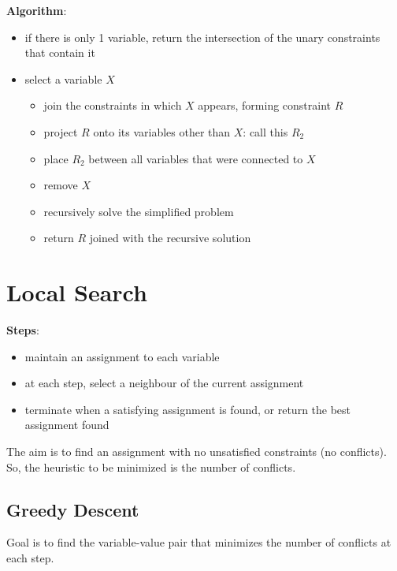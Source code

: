 \documentclass[11pt]{article}
\begin{document}
\textbf{Algorithm}:
\begin{itemize}
\item if there is only 1 variable, return the intersection of the unary constraints that contain it
\item select a variable \(X\)
\begin{itemize}
\item join the constraints in which \(X\) appears, forming constraint \(R\)
\item project \(R\) onto its variables other than \(X\): call this \(R_{2}\)
\item place \(R_{2}\) between all variables that were connected to \(X\)
\item remove \(X\)
\item recursively solve the simplified problem
\item return \(R\) joined with the recursive solution
\end{itemize}
\end{itemize}
\section{Local Search}
\label{sec:org48dc29d}
\textbf{Steps}:
\begin{itemize}
\item maintain an assignment to each variable
\item at each step, select a neighbour of the current assignment
\item terminate when a satisfying assignment is found, or return the best assignment found
\end{itemize}

The aim is to find an assignment with no unsatisfied constraints (no conflicts).
So, the heuristic to be minimized is the number of conflicts.
\subsection{Greedy Descent}
\label{sec:org807aa01}
Goal is to find the variable-value pair that minimizes the number of conflicts at each step.
\end{document}
